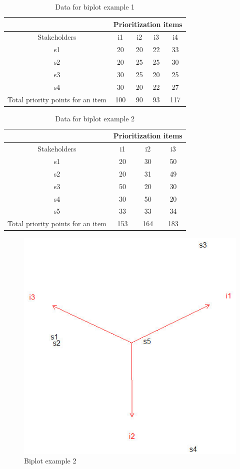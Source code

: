 \begin{table}
	\center
	\scriptsize
\caption{\label{tab:Data-for-Biplot}Data for biplot example 1}
\begin{tabular}{|c|c|c|c|c|}
\hline 
 & \multicolumn{4}{c|}{Prioritization items}\tabularnewline
\hline 
Stakeholders & i1 & i2 & i3 & i4\tabularnewline
\hline
\hline 
s1 & 20 & 20 & 22 & 33\tabularnewline
\hline 
s2 & 20 & 25 & 25 & 30\tabularnewline
\hline 
s3 & 30 & 25 & 20 & 25\tabularnewline
\hline 
s4 & 30 & 20 & 22 & 27\tabularnewline
\hline 
Total priority points for an item & 100 & 90 & 93 & 117\tabularnewline
\hline
\end{tabular}
\end{table}

\begin{table}
	\scriptsize
	\center
\caption{\label{tab:Data-for-biplot}Data for biplot example 2}

\begin{tabular}{|c|c|c|c|}
\hline 
 & \multicolumn{3}{c|}{Prioritization items}\tabularnewline
\hline 
Stakeholders & i1 & i2 & i3\tabularnewline
\hline
\hline 
s1 & 20 & 30 & 50\tabularnewline
\hline 
s2 & 20 & 31 & 49\tabularnewline
\hline 
s3 & 50 & 20 & 30\tabularnewline
\hline 
s4 & 30 & 50 & 20\tabularnewline
\hline 
s5 & 33 & 33 & 34\tabularnewline
\hline 
Total priority points for an item & 153 & 164 & 183\tabularnewline
\hline
\end{tabular}
\end{table}

\begin{figure}
	\center
\includegraphics[scale=0.5]{fig/biplot3}
\caption{\label{fig:Biplot-example-2}Biplot example 2}
\end{figure}

